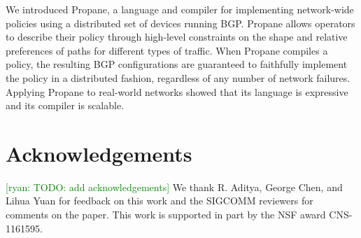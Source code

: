 \documentclass[10pt]{sigalternate052015}
\newcommand{\ryan}[1]{\textcolor{green}{[ryan: #1]}}
\newcommand{\sysname}{{\small \sf Propane}\xspace}
\begin{document}
We introduced \sysname, a language and compiler for implementing network-wide policies using a distributed set of devices running BGP. Propane allows operators to describe their policy through high-level constraints on the shape and relative preferences of paths for different types of traffic. When \sysname compiles a policy, the resulting BGP configurations are guaranteed to faithfully implement the policy in a distributed fashion, regardless of any number of network failures. Applying \sysname to real-world networks showed that its language is expressive and its compiler is scalable.


\section*{Acknowledgements}

\ryan{TODO: add acknowledgements}
We thank R. Aditya, George Chen, and Lihua Yuan for feedback on this work and the SIGCOMM reviewers for comments on the paper.
This work is supported in part by
the NSF award CNS-1161595.



%
%
%
%
\end{document}
